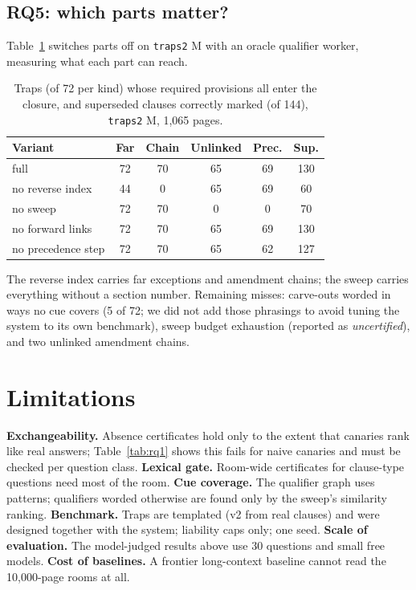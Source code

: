 \documentclass[11pt]{article}
\begin{document}
\subsection{RQ5: which parts matter?}
Table~\ref{tab:ablation} switches parts off on \texttt{traps2} M with an oracle qualifier worker, measuring what each part can reach.

\begin{table}[t]
\centering\small
\setlength{\tabcolsep}{3pt}
\begin{tabular}{lccccc}
\toprule
Variant & Far & Chain & Unlinked & Prec. & Sup. \\
\midrule
full & 72 & 70 & 65 & 69 & 130 \\
no reverse index & 44 & 0 & 65 & 69 & 60 \\
no sweep & 72 & 70 & 0 & 0 & 70 \\
no forward links & 72 & 70 & 65 & 69 & 130 \\
no precedence step & 72 & 70 & 65 & 62 & 127 \\
\bottomrule
\end{tabular}
\caption{Traps (of 72 per kind) whose required provisions all enter the closure, and superseded clauses correctly marked (of 144), \texttt{traps2} M, 1,065 pages.}
\label{tab:ablation}
\end{table}

\noindent The reverse index carries far exceptions and amendment chains; the sweep carries everything without a section number. Remaining misses: carve-outs worded in ways no cue covers (5 of 72; we did not add those phrasings to avoid tuning the system to its own benchmark), sweep budget exhaustion (reported as \emph{uncertified}), and two unlinked amendment chains.

\section*{Limitations}
\textbf{Exchangeability.} Absence certificates hold only to the extent that canaries rank like real answers; Table~\ref{tab:rq1} shows this fails for naive canaries and must be checked per question class. \textbf{Lexical gate.} Room-wide certificates for clause-type questions need most of the room. \textbf{Cue coverage.} The qualifier graph uses patterns; qualifiers worded otherwise are found only by the sweep's similarity ranking. \textbf{Benchmark.} Traps are templated (v2 from real clauses) and were designed together with the system; liability caps only; one seed. \textbf{Scale of evaluation.} The model-judged results above use 30 questions and small free models. \textbf{Cost of baselines.} A frontier long-context baseline cannot read the 10,000-page rooms at all.
\end{document}
